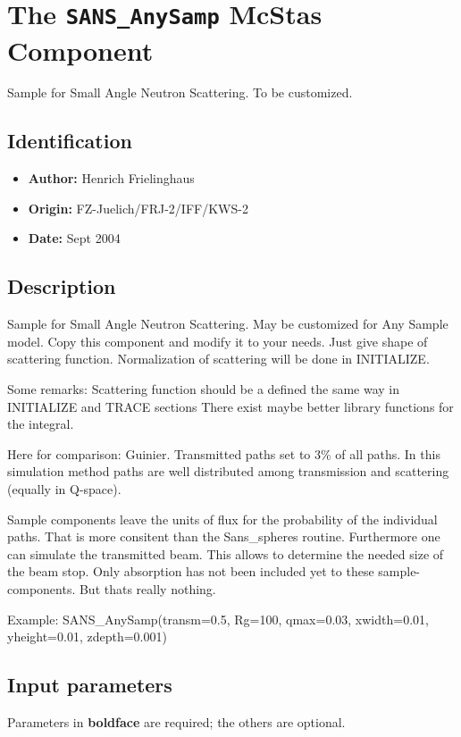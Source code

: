 \section{The \texttt{SANS\_AnySamp} McStas Component}
Sample for Small Angle Neutron Scattering. To be customized.

\subsection*{Identification}
\begin{itemize}
  \item \textbf{Author:} Henrich Frielinghaus
  \item \textbf{Origin:} FZ-Juelich/FRJ-2/IFF/KWS-2
  \item \textbf{Date:} Sept 2004
\end{itemize}

\subsection*{Description}
Sample for Small Angle Neutron Scattering. May be customized for Any Sample model. Copy this component and modify it to your needs. Just give shape of scattering function. Normalization of scattering will be done in INITIALIZE.

Some remarks: Scattering function should be a defined the same way in INITIALIZE and TRACE sections There exist maybe better library functions for the integral.

Here for comparison: Guinier. Transmitted paths set to 3\% of all paths. In this simulation method paths are well distributed among transmission and scattering (equally in Q-space).

Sample components leave the units of flux for the probability of the individual paths. That is more consitent than the Sans\_spheres routine. Furthermore one can simulate the transmitted beam. This allows to determine the needed size of the beam stop. Only absorption has not been included yet to these sample-components. But thats really nothing.

Example: SANS\_AnySamp(transm=0.5, Rg=100, qmax=0.03, xwidth=0.01, yheight=0.01, zdepth=0.001)

\subsection*{Input parameters}
Parameters in \textbf{boldface} are required; the others are optional.

